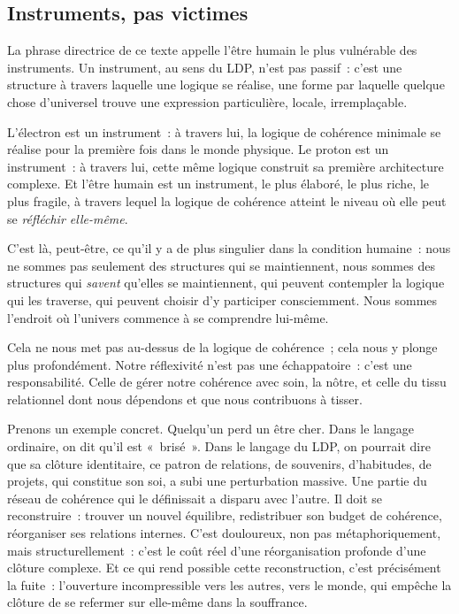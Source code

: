 \documentclass[12pt, a4paper, openright]{book}
\begin{document}
\subsection*{Instruments, pas victimes}

La phrase directrice de ce texte appelle l'être humain \og le plus vulnérable des instruments\fg{}. Un instrument, au sens du LDP, n'est pas passif~: c'est une structure à travers laquelle une logique se réalise, une forme par laquelle quelque chose d'universel trouve une expression particulière, locale, irremplaçable.

\medskip

L'électron est un instrument~: à travers lui, la logique de cohérence minimale se réalise pour la première fois dans le monde physique. Le proton est un instrument~: à travers lui, cette même logique construit sa première architecture complexe. Et l'être humain est un instrument, le plus élaboré, le plus riche, le plus fragile, à travers lequel la logique de cohérence atteint le niveau où elle peut se \emph{réfléchir elle-même}.

\medskip

C'est là, peut-être, ce qu'il y a de plus singulier dans la condition humaine~: nous ne sommes pas seulement des structures qui se maintiennent, nous sommes des structures qui \emph{savent} qu'elles se maintiennent, qui peuvent contempler la logique qui les traverse, qui peuvent choisir d'y participer consciemment. Nous sommes l'endroit où l'univers commence à se comprendre lui-même.

\medskip

Cela ne nous met pas au-dessus de la logique de cohérence~; cela nous y plonge plus profondément. Notre réflexivité n'est pas une échappatoire~: c'est une responsabilité. Celle de gérer notre cohérence avec soin, la nôtre, et celle du tissu relationnel dont nous dépendons et que nous contribuons à tisser.

\medskip

Prenons un exemple concret. Quelqu'un perd un être cher. Dans le langage ordinaire, on dit qu'il est «~brisé~». Dans le langage du LDP, on pourrait dire que sa clôture identitaire, ce patron de relations, de souvenirs, d'habitudes, de projets, qui constitue son soi, a subi une perturbation massive. Une partie du réseau de cohérence qui le définissait a disparu avec l'autre. Il doit se reconstruire~: trouver un nouvel équilibre, redistribuer son budget de cohérence, réorganiser ses relations internes. C'est douloureux, non pas métaphoriquement, mais structurellement~: c'est le coût réel d'une réorganisation profonde d'une clôture complexe. Et ce qui rend possible cette reconstruction, c'est précisément la fuite~: l'ouverture incompressible vers les autres, vers le monde, qui empêche la clôture de se refermer sur elle-même dans la souffrance.
\end{document}
